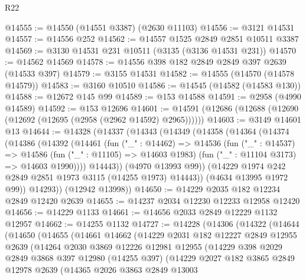 \begin{lexlean}{R22}
\begin{coremodule}
@14555 := @14550 (@14551 @3387) (@2630 @11103)
@14556 := @3121 @14531
@14557 := @14556 @252
@14562 := @14557 @1525 @2849 @2851 @10511 @3387
@14569 := @3130 @14531 @231 @10511 (@3135 (@3136 @14531 @231))
@14570 := @14562 @14569
@14578 := @14556 @398 @182 @2849 @2849 @397 @2639 (@14533 @397)
@14579 := @3155 @14531
@14582 := @14555 (@14570 (@14578 @14579))
@14583 := @3160 @10510
@14586 := @14545 (@14582 (@14583 @130))
@14588 := @12672 @145 @99
@14589 := @153 @14588
@14591 := @2958 (@4990 @14589)
@14592 := @153 @12696
@14601 := @14591 (@12686 (@12688 (@12690 (@12692 (@12695 (@2958 (@2962 @14592) @2965))))))
@14603 := @3149 @14601 @13
@14644 := @14328
    (@14337
      (@14343
        (@14349
          (@14358
            (@14364
              (@14374
                (@14386
                  (@14392
                    (@14461
                      (fun ("_" : @14462) =>
                      @14536
                        (fun ("_" : @14537) =>
                        @14586
                          (fun ("_" : @11105) => @14603 @1983)
                          (fun ("_" : @11104 @3173) => @14603 @1990))))
                    @14443))
                (@4970 @13993 @99))
              (@14229 @1974 @242 @2849 @2851 @1973 @3115 (@14255 @1973) @14443))
            (@4634 @13995 @1972 @99))
          @14293))
      (@12942 @13998))
@14650 := @14229 @2035 @182 @12234 @2849 @12420 @2639
@14655 := @14237 @2034 @12230 @12233 @12958 @12420
@14656 := @14229 @1133
@14661 := @14656 @2033 @2849 @12229 @1132 @12957
@14662 := @14255 @1132
@14727 := @14228
    (@14306
      (@14322
        (@14644
          (@14650
            (@14655
              (@14661
                @14662
                (@14229
                  @2031
                  @182
                  @12227
                  @2849
                  @12955
                  @2639
                  (@14264
                    @2030
                    @3869
                    @12226
                    @12981
                    @12955
                    (@14229
                      @398
                      @2029
                      @2849
                      @3868
                      @397
                      @12980
                      (@14255 @397)
                      (@14229
                        @2027
                        @182
                        @3865
                        @2849
                        @12978
                        @2639
                        (@14365
                          @2026
                          @3863
                          @2849
                          @13003

\end{coremodule}
\end{lexlean}
